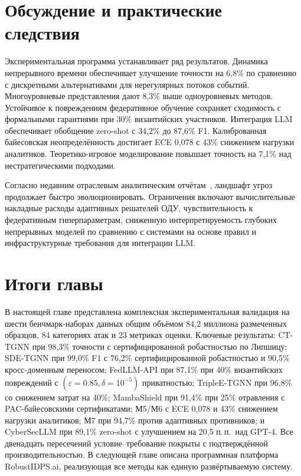 \section{Обсуждение и практические следствия}
\label{sec:discussion}

Экспериментальная программа устанавливает ряд результатов. Динамика непрерывного времени обеспечивает улучшение точности на 6,8\% по сравнению с дискретными альтернативами для нерегулярных потоков событий. Многоуровневые представления дают 8,3\% выше одноуровневых методов. Устойчивое к повреждениям федеративное обучение сохраняет сходимость с формальными гарантиями при 30\% византийских участников. Интеграция LLM обеспечивает обобщение zero-shot с 34,2\% до 87,6\% F1. Калиброванная байесовская неопределённость достигает ECE 0,078 с 43\% снижением нагрузки аналитиков. Теоретико-игровое моделирование повышает точность на 7,1\% над нестратегическими подходами.

Согласно недавним отраслевым аналитическим отчётам~\cite{Verizon2024,IBM2024}, ландшафт угроз продолжает быстро эволюционировать. Ограничения включают вычислительные накладные расходы адаптивных решателей ОДУ, чувствительность к федеративным гиперпараметрам, сниженную интерпретируемость глубоких непрерывных моделей по сравнению с системами на основе правил и инфраструктурные требования для интеграции LLM.


\section{Итоги главы}
\label{sec:ch4_summary}

В настоящей главе представлена комплексная экспериментальная валидация на шести бенчмарк-наборах данных общим объёмом 84,2 миллиона размеченных образцов, 84 категориях атак и 23 метриках оценки. Ключевые результаты: CT-TGNN при 98,3\% точности с сертифицированной робастностью по Липшицу; SDE-TGNN при 99,0\% F1 с 76,2\% сертифицированной робастностью и 90,5\% кросс-доменным переносом; FedLLM-API при 87,1\% при 40\% византийских повреждений с $(\varepsilon{=}0.85,\delta{=}10^{-5})$ приватностью; TripleE-TGNN при 96,8\% со снижением затрат на 40\%; MambaShield при 91,4\% при 25\% отравления с PAC-байесовскими сертификатами; М5/М6 с ECE 0,078 и 43\% снижением нагрузки аналитиков; М7 при 94,7\% против адаптивных противников; и CyberSecLLM при 89,1\% zero-shot с улучшением на 20,5 п.\,п.\ над GPT-4. Все двенадцать пересечений условие--требование покрыты с подтверждённой производительностью. В следующей главе описана программная платформа RobustIDPS.ai, реализующая все методы как единую развёртываемую систему.


